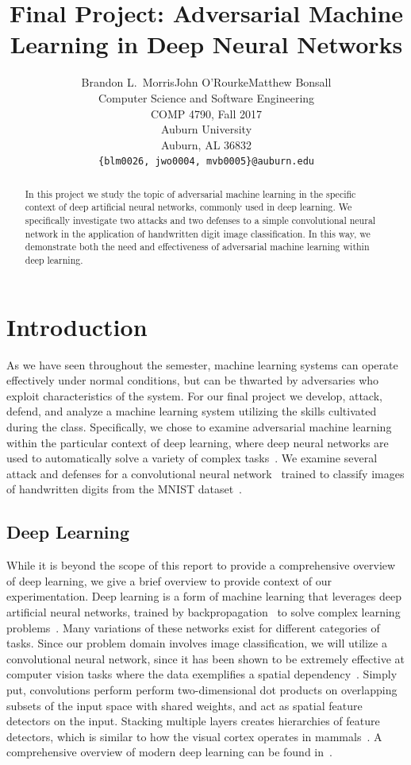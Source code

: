 \documentclass{article}
\title{Final Project: Adversarial Machine Learning in Deep Neural Networks}
\author{Brandon L.~Morris\qquad John O'Rourke\qquad Matthew Bonsall\\
  Computer Science and Software Engineering\\
  COMP 4790, Fall 2017\\
  Auburn University\\
  Auburn, AL 36832\\
  \texttt{\{blm0026, jwo0004, mvb0005\}@auburn.edu}}
\begin{document}
\maketitle


\begin{abstract}
In this project we study the topic of adversarial machine learning in the
specific context of deep artificial neural networks, commonly used in deep
learning. We specifically investigate two attacks and two defenses to a simple
convolutional neural network in the application of handwritten digit image
classification. In this way, we demonstrate both the need and effectiveness of
adversarial machine learning within deep learning.
\end{abstract}

\section{Introduction}

As we have seen throughout the semester, machine learning systems can operate
effectively under normal conditions, but can be thwarted by adversaries who
exploit characteristics of the system. For our final project we develop, attack,
defend, and analyze a machine learning system utilizing the skills cultivated
during the class. Specifically, we chose to examine adversarial machine learning
within the particular context of deep learning, where deep neural networks are
used to automatically solve a variety of complex tasks~\cite{lecun2015deep}.
We examine several attack and defenses for a convolutional neural
network~\cite{goodfellow2016deep} trained to classify images of handwritten
digits from the MNIST dataset~\cite{lecun1998mnist}.

\subsection{Deep Learning}

While it is beyond the scope of this report to provide a comprehensive overview
of deep learning, we give a brief overview to provide context of our
experimentation. Deep learning is a form of machine learning that leverages deep
artificial neural networks, trained by backpropagation~\cite{le1988theoretical}
to solve complex learning problems~\cite{goodfellow2016deep}. Many variations of
these networks exist for different categories of tasks. Since our problem domain
involves image classification, we will utilize a convolutional neural network,
since it has been shown to be extremely effective at computer vision tasks where
the data exemplifies a spatial dependency~\cite{krizhevsky2012imagenet}. Simply
put, convolutions perform perform two-dimensional dot products on overlapping
subsets of the input space with shared weights, and act as spatial feature
detectors on the input. Stacking multiple layers creates hierarchies of feature
detectors, which is similar to how the visual cortex operates in
mammals~\cite{hubel1962receptive}. A comprehensive overview of modern deep
learning can be found in~\cite{goodfellow2016deep}.
\end{document}

